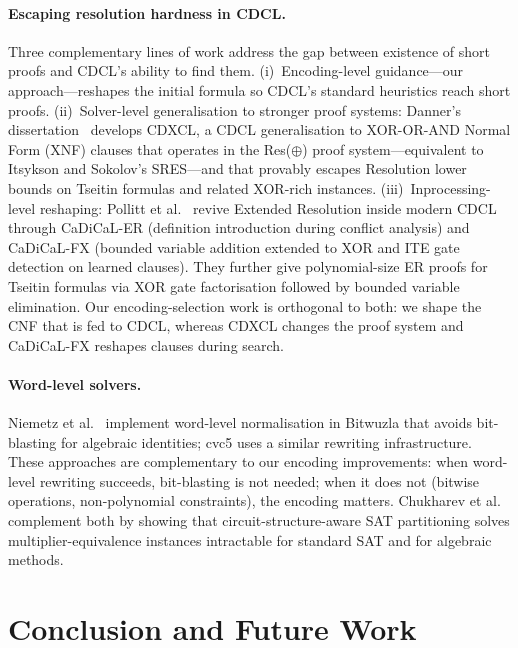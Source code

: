 \documentclass[a4paper]{ceurart}
\begin{document}
\paragraph{Escaping resolution hardness in CDCL.}
Three complementary lines of work address the gap between
existence of short proofs and CDCL's ability to find them.
(i)~Encoding-level guidance---our approach---reshapes the
initial formula so CDCL's standard heuristics reach short
proofs. (ii)~Solver-level generalisation to stronger proof
systems: Danner's dissertation~\cite{danner2025sat} develops
CDXCL, a CDCL generalisation to XOR-OR-AND Normal Form
(XNF) clauses that operates in the Res($\oplus$) proof
system---equivalent to Itsykson and Sokolov's SRES---and
that provably escapes Resolution lower bounds on Tseitin
formulas and related XOR-rich instances.
(iii)~Inprocessing-level reshaping: Pollitt et
al.~\cite{pollitt2026factoring} revive Extended Resolution
inside modern CDCL through CaDiCaL-ER (definition introduction
during conflict analysis) and CaDiCaL-FX (bounded variable
addition extended to XOR and ITE gate detection on learned
clauses). They further give polynomial-size ER proofs for
Tseitin formulas via XOR gate factorisation followed by
bounded variable elimination. Our encoding-selection work is
orthogonal to both: we shape the CNF that is fed to CDCL,
whereas CDXCL changes the proof system and CaDiCaL-FX
reshapes clauses during search.

\paragraph{Word-level solvers.}
Niemetz et al.~\cite{niemetz2023bitwuzla} implement word-level
normalisation in Bitwuzla that avoids bit-blasting for algebraic
identities; cvc5 uses a similar rewriting infrastructure. These
approaches are complementary to our encoding improvements: when
word-level rewriting succeeds, bit-blasting is not needed; when it
does not (bitwise operations, non-polynomial constraints), the
encoding matters. Chukharev et al.~\cite{chukharev2025partitioning}
complement both by showing that circuit-structure-aware SAT
partitioning solves multiplier-equivalence instances intractable
for standard SAT and for algebraic methods.


\section{Conclusion and Future Work}
\end{document}
